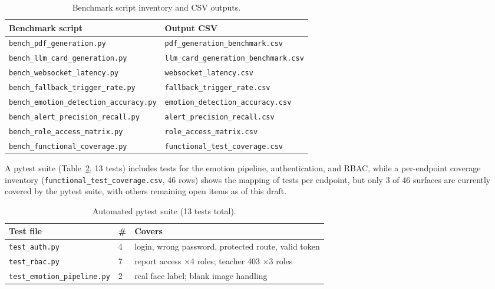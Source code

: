 \documentclass[conference]{IEEEtran}
\begin{document}
\begin{table}[!t]
\caption{Benchmark script inventory and CSV outputs.}
\label{tab:V}
\centering
\scriptsize
\begin{tabular}{@{}ll@{}}
\toprule
\textbf{Benchmark script} & \textbf{Output CSV} \\
\midrule
\texttt{bench\_pdf\_generation.py} & \texttt{pdf\_generation\_benchmark.csv} \\
\texttt{bench\_llm\_card\_generation.py} & \texttt{llm\_card\_generation\_benchmark.csv} \\
\texttt{bench\_websocket\_latency.py} & \texttt{websocket\_latency.csv} \\
\texttt{bench\_fallback\_trigger\_rate.py} & \texttt{fallback\_trigger\_rate.csv} \\
\texttt{bench\_emotion\_detection\_accuracy.py} & \texttt{emotion\_detection\_accuracy.csv} \\
\texttt{bench\_alert\_precision\_recall.py} & \texttt{alert\_precision\_recall.csv} \\
\texttt{bench\_role\_access\_matrix.py} & \texttt{role\_access\_matrix.csv} \\
\texttt{bench\_functional\_coverage.py} & \texttt{functional\_test\_coverage.csv} \\
\bottomrule
\end{tabular}
\end{table}

A pytest suite (Table~\ref{tab:VI}, 13 tests) includes tests for the emotion pipeline, authentication, and RBAC, while a per-endpoint coverage inventory (\texttt{functional\_test\_coverage.csv}, 46 rows) shows the mapping of tests per endpoint, but only 3 of 46 surfaces are currently covered by the pytest suite, with others remaining open items as of this draft.

\begin{table}[!t]
\caption{Automated pytest suite (13 tests total).}
\label{tab:VI}
\centering
\small
\begin{tabular}{@{}llp{3.3cm}@{}}
\toprule
\textbf{Test file} & \textbf{\#} & \textbf{Covers} \\
\midrule
\texttt{test\_auth.py} & 4 & login, wrong password, protected route, valid token \\
\texttt{test\_rbac.py} & 7 & report access $\times$4 roles; teacher 403 $\times$3 roles \\
\texttt{test\_emotion\_pipeline.py} & 2 & real face label; blank image handling \\
\bottomrule
\end{tabular}
\end{table}
\end{document}

